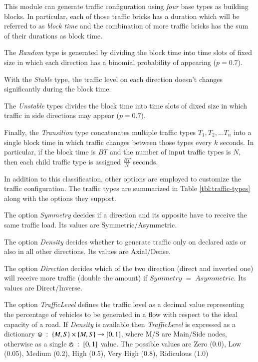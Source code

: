 This module can generate traffic configuration using \textit{four} base types as building blocks.
In particular, each of those traffic bricks has a duration which will be referred to as \textit{block time} and the combination of more traffic bricks has the sum of their durations as block time.

The \textit{Random} type is generated by dividing the block time into time slots of fixed size in which each direction has a binomial probability of appearing ($p=0.7$).

With the \textit{Stable} type, the traffic level on each direction doesn't changes significantly during the block time.

The \textit{Unstable} types divides the block time into time slots of dixed size in which traffic in side directions may appear ($p=0.7$).

Finally, the \textit{Transition} type concatenates multiple traffic types $T_1, T_2, ... T_n$ into a single block time in which traffic changes between those types every $k$ seconds. In particular, if the block time is $BT$ and the number of input traffic types is $N$, then each child traffic type is assigned $\frac {BT} {N}$ seconds.

In addition to this classification, other options are employed to customize the traffic configuration.
The traffic types are summarized in Table \ref{tbl:traffic-types} along with the options they support.

The option \textit{Symmetry} decides if a direction and its opposite have to receive the same traffic load. Its values are Symmetric/Asymmetric.

The option \textit{Density} decides whether to generate traffic only on declared axis or also in all other directions. Its values are Axial/Dense.

The option \textit{Direction} decides which of the two direction (direct and inverted one) will receive more traffic (double the amount) if $Symmetry \; = \; Asymmetric$. Its values are Direct/Inverse.

The option \textit{TrafficLevel} defines the traffic level as a decimal value representing the percentage of vehicles to be generated in a flow with respect to the ideal capacity of a road.
If \textit{Density} is available then \textit{TrafficLevel} is expressed as a dictionary $\circledvee \; : \; \{M, S\} \times \{M, S\} \rightarrow [0, 1]$, where M/S are Main/Side nodes, otherwise as a single $\circledwedge \; : \; [0,1]$ value.
The possible values are Zero (0.0), Low (0.05), Medium (0.2), High (0.5), Very High (0.8), Ridiculous (1.0)

